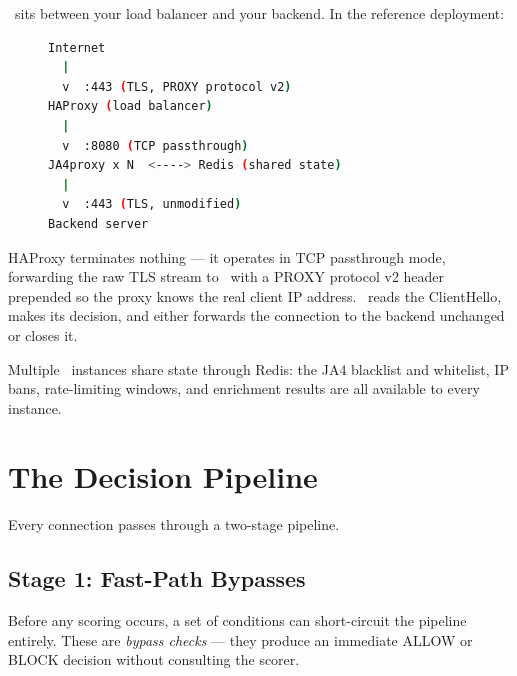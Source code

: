 \ja\ sits between your load balancer and your backend. In the reference deployment:

\begin{figure}[ht]
\begin{lstlisting}[language=bash, numbers=none, backgroundcolor=\color{white}, frame=none, xleftmargin=0pt, framexleftmargin=0pt]
Internet
  |
  v  :443 (TLS, PROXY protocol v2)
HAProxy (load balancer)
  |
  v  :8080 (TCP passthrough)
JA4proxy x N  <----> Redis (shared state)
  |
  v  :443 (TLS, unmodified)
Backend server
\end{lstlisting}
\end{figure}

HAProxy terminates nothing — it operates in TCP passthrough mode, forwarding the raw
TLS stream to \ja\ with a PROXY protocol v2 header prepended so the proxy knows the
real client IP address. \ja\ reads the ClientHello, makes its decision, and either
forwards the connection to the backend unchanged or closes it.

Multiple \ja\ instances share state through Redis: the JA4 blacklist and whitelist,
IP bans, rate-limiting windows, and enrichment results are all available to every
instance.

\section{The Decision Pipeline}

Every connection passes through a two-stage pipeline.

\subsection{Stage 1: Fast-Path Bypasses}

Before any scoring occurs, a set of conditions can short-circuit the pipeline
entirely. These are \emph{bypass checks} — they produce an immediate ALLOW or BLOCK
decision without consulting the scorer.

